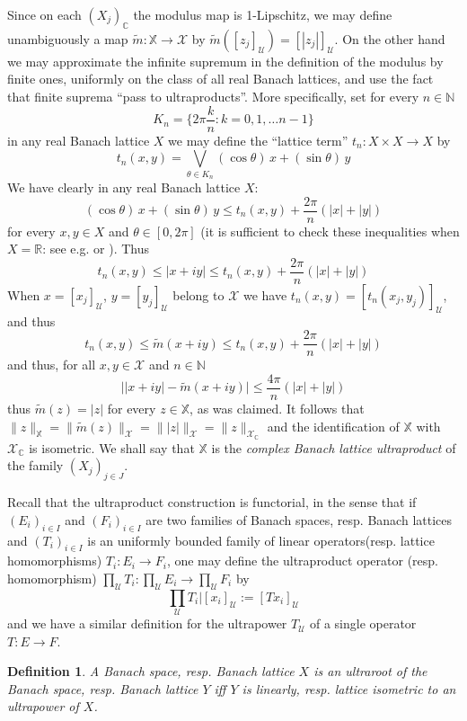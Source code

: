 \documentclass[11pt]{amsart}
\theoremstyle{plain}
\newtheorem{definition}[theorem]{Definition}
\theoremstyle{remark}
\newcommand{\U}{\mathcal U}
\begin{document}
 Since on each $(X_j)_\mathbb C$ the  modulus map is 1-Lipschitz, we may define unambiguously a map $\tilde m: \mathbb X\to \mathcal X$ by $\tilde m([z_j]_\U)=[|z_j|]_\U$. On the other hand we may approximate the infinite supremum in the definition of the modulus by  finite ones, uniformly on the class of all real Banach lattices, and use the fact that finite suprema ``pass to ultraproducts''. More specifically, set for every $n\in \mathbb N$
 \[ K_n=\{2\pi \frac kn: k=0,1,\dots n-1\} \]
in any real Banach lattice $X$ we may define the  ``lattice term'' $t_n: X\times X\to X$ by
\[t_n(x,y)=\bigvee_{\theta\in K_n} (\cos \theta)\,x+(\sin\theta)\,y\]
We have clearly in any real Banach lattice $X$:
\[(\cos \theta)\,x+(\sin\theta)\,y \le  t_n(x,y)+\frac{2\pi}n (|x|+|y|) \]
for every $x,y\in X$ and $\theta\in [0,2\pi]$ (it is sufficient to check these inequalities when $X=\mathbb R$: see e.g. \cite[p. 66]{MN} or \cite[Corollary 352M]{F}). Thus
\[t_n(x,y)\le |x+iy|\le t_n(x,y)+\frac{2\pi}n (|x|+|y|) \]
When $x=[x_j]_\U$, $y=[y_j]_\U$ belong to $\mathcal X$ we have $t_n(x,y)=[t_n(x_j,y_j)]_\U$, and thus
\[t_n(x,y)\le \tilde m(x+iy)\le t_n(x,y)+\frac{2\pi}n (|x|+|y|)\]
and thus, for all $x,y\in\mathcal X$ and $n\in\mathbb N$
\[ \big| |x+iy|-\tilde m(x+iy)\big|\le \frac{4\pi}n (|x|+|y|)\]
thus $\tilde m(z)=|z|$ for every $z\in \mathbb X$, as was claimed. It follows that $\|z\|_\mathbb X= \|\tilde m(z)\|_\mathcal X= \| |z| \|_\mathcal X= \|z\|_{\mathcal X_\mathbb C}$ and the identification of $\mathbb X$ with $\mathcal X_\mathbb C$ is isometric. We shall say that $\mathbb X$ is the {\it complex Banach lattice ultraproduct} of the family $(X_j)_{j\in J}$.

Recall that the ultraproduct construction is functorial, in the sense that if $(E_i)_{i\in I}$ and $(F_i)_{i\in I}$ are two families of Banach spaces, resp. Banach lattices and $(T_i)_{i\in I}$ is an uniformly bounded family of linear operators(resp. lattice homomorphisms) $T_i:E_i\to F_i$, one may define the ultraproduct operator (resp. homomorphism) $\prod_\U T_i: \prod_\U E_i\to \prod_\U F_i$ by 
\[{\textstyle\prod_\U }T_i |[x_i]_\U:= [Tx_i]_\U\]
and we have a similar definition for the ultrapower $T_\U$ of a single operator $T:E\to F$.

\begin{definition}
A Banach space, resp. Banach lattice $X$ is an {\rm ultraroot} of the Banach space, resp. Banach lattice $Y$ iff $Y$ is linearly, resp. lattice isometric to an ultrapower of $X$. 
\end{definition}
\end{document}
